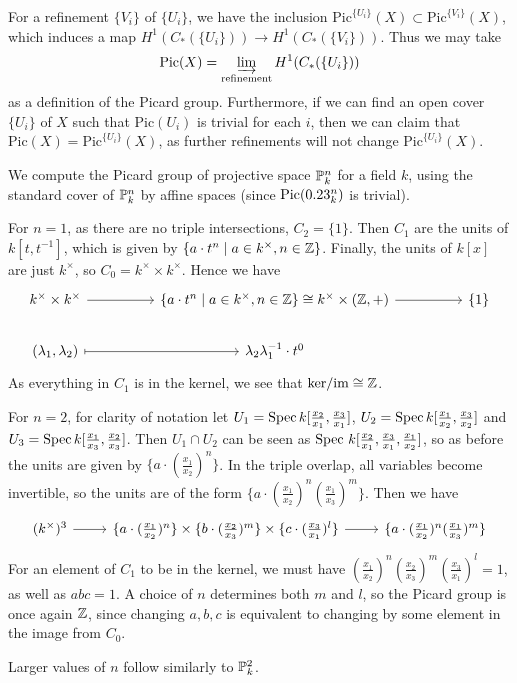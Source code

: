 For a refinement $\{V_i\}$ of $\{U_i\}$, we have the inclusion $\mathrm{Pic}^{\{U_i\}}(X) \subset \mathrm{Pic}^{\{V_i\}}(X)$, which induces a map $H^1(C_*(\{U_i\})) \to  H^1(C_*(\{V_i\}))$. Thus we may take 
\[
\mathrm{Pic}(X) = \varinjlim_{\mathrm{refinement}} H^1(C_*(\{U_i\}))
\]
as a definition of the Picard group. Furthermore, if we can find an open cover $\{U_i\}$ of $X$ such that $\mathrm{Pic}(U_i)$ is trivial for each $i$, then we can claim that $\mathrm{Pic}(X) = \mathrm{Pic}^{\{U_i\}}(X)$, as further refinements will not change $\mathrm{Pic}^{\{U_i\}}(X)$. 
\begin{example}
    We compute the Picard group of projective space $\P^n_k$ for a field $k$, using the standard cover of $\P^n_k$ by affine spaces (since $\mathrm{Pic}(\A^n_k)$ is trivial).

    For $n=1$, as there are no triple intersections, $C_2 = \{1\}$. Then $C_1$ are the units of $k[t, t^{-1}]$, which is given by $\{a \cdot t^n \mid a \in k^\times, n \in \Z\}$. Finally, the units of $k[x]$ are just $k^\times$, so $C_0 = k^\times \times k^\times$. Hence we have
    \[
    \begin{tikzcd}
    k^\times \times k^\times && \{a \cdot t^n \mid a \in k^\times, n \in \Z\} \cong k^\times \times (\Z, +) && \{1\} \\
    (\lambda_1, \lambda_2) && \lambda_2 \lambda_1^{-1} \cdot t^0 && 
    \arrow[maps to, from=2-1, to=2-3]
    \arrow[from=1-1, to=1-3]
	\arrow[from=1-3, to=1-5]
    \end{tikzcd}
    \]
    As everything in $C_1$ is in the kernel, we see that $\mathrm{ker}/\mathrm{im} \cong \Z$. 

    For $n = 2$, for clarity of notation let $U_1 = \Spec k[\frac{x_2}{x_1}, \frac{x_3}{x_1}]$, $U_2 = \Spec k[\frac{x_1}{x_2}, \frac{x_3}{x_2}]$ and $U_3 = \Spec k[\frac{x_1}{x_3}, \frac{x_2}{x_3}]$. Then $U_1 \cap U_2$ can be seen as $\Spec \, k[\frac{x_2}{x_1}, \frac{x_3}{x_1}, \frac{x_1}{x_2}]$, so as before the units are given by $\{a \cdot (\frac{x_1}{x_2})^n\}$. In the triple overlap, all variables become invertible, so the units are of the form $\{a \cdot (\frac{x_1}{x_2})^n(\frac{x_1}{x_3})^m\}$. Then we have
    \[
    \begin{tikzcd}
    (k^\times)^3 & \{a \cdot (\frac{x_1}{x_2})^n\} \times \{b \cdot (\frac{x_2}{x_3})^m\} \times \{c \cdot (\frac{x_3}{x_1})^l\} & \{a \cdot (\frac{x_1}{x_2})^n(\frac{x_1}{x_3})^m\}
    \arrow[from=1-1, to=1-2]
	\arrow[from=1-2, to=1-3]
    \end{tikzcd}
    \]
    For an element of $C_1$ to be in the kernel, we must have $(\frac{x_1}{x_2})^n(\frac{x_2}{x_3})^m(\frac{x_3}{x_1})^l = 1$, as well as $abc = 1$. A choice of $n$ determines both $m$ and $l$, so the Picard group is once again $\Z$, since changing $a, b, c$ is equivalent to changing by some element in the image from $C_0$.

    Larger values of $n$ follow similarly to $\P^2_k$.  
\end{example}
